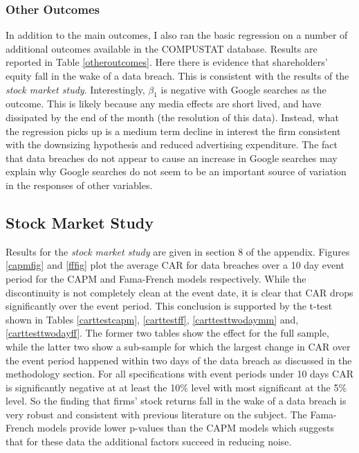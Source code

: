 \documentclass[../Main.tex]{subfiles}
\begin{document}
\subsubsection{Other Outcomes}

In addition to the main outcomes, I also ran the basic regression on a number of additional outcomes available in the COMPUSTAT database. Results are reported in Table \ref{otheroutcomes}. Here there is evidence that shareholders' equity fall in the wake of a data breach. This is consistent with the results of the \textit{stock market study}. Interestingly, $\beta_1$ is negative with Google searches as the outcome. This is likely because any media effects are short lived, and have dissipated by the end of the month (the resolution of this data). Instead, what the regression picks up is a medium term decline in interest the firm consistent with the downsizing hypothesis and reduced advertising expenditure. The fact that data breaches do not appear to cause an increase in Google searches may explain why Google searches do not seem to be an important source of variation in the responses of other variables.

\subsection{Stock Market Study}

Results for the \textit{stock market study} are given in section 8 of the appendix. Figures \ref{capmfig} and \ref{fffig} plot the average CAR for data breaches over a 10 day event period for the CAPM and Fama-French models respectively. While the discontinuity is not completely clean at the event date, it is clear that CAR drops significantly over the event period. This conclusion is supported by the t-test shown in Tables \ref{carttestcapm}, \ref{carttestff}, \ref{carttesttwodaymm} and, \ref{carttesttwodayff}. The former two tables show the effect for the full sample, while the latter two show a sub-sample for which the largest change in CAR over the event period happened within two days of the data breach as discussed in the methodology section. For all specifications with event periods under 10 days CAR is significantly negative at at least the 10\% level with most significant at the 5\% level. So the finding that firms' stock returns fall in the wake of a data breach is very robust and consistent with previous literature on the subject. The Fama-French models provide lower p-values than the CAPM models which suggests that for these data the additional factors succeed in reducing noise. 
\end{document}
